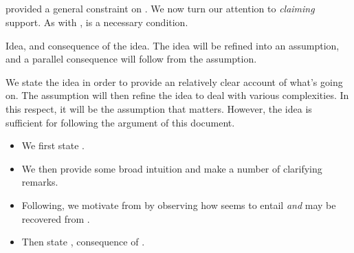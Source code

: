 

\subsection{}
\label{sec:ideaCS}


\subsubsection{}
\label{sec:ideaCS}

\begin{note}
  \ideaS{} provided a general constraint on \support{}.
  We now turn our attention to \emph{claiming} support.
  As with \ideaS{}, \ideaCS{} is a necessary condition.

  Idea, and consequence of the idea.
  The idea will be refined into an assumption, and a parallel consequence will follow from the assumption.

  We state the idea in order to provide an relatively clear account of what's going on.
  The assumption will then refine the idea to deal with various complexities.
  In this respect, it will be the assumption that matters.
  However, the idea is sufficient for following the argument of this document.

  \begin{itemize}
  \item We first state \ideaCS{}.
  \item We then provide some broad intuition and make a number of clarifying remarks.
  \item Following, we motivate \ideaCS{} from \ideaS{} by observing how \ideaS{} seems to entail \ideaCS{} \emph{and} \ideaS{} may be recovered from \ideaCS{}.
  \item Then state \ideaCSC{}, consequence of \ideaCS{}.
  \end{itemize}
\end{note}

